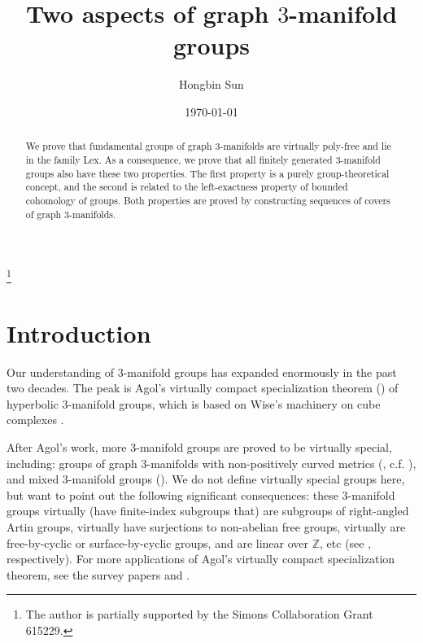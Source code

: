\documentclass{amsart}
\numberwithin{equation}{section}
\theoremstyle{definition}
\begin{document}
\title[Two aspects of graph $3$-manifold groups]{Two aspects of graph $3$-manifold groups}



\author{Hongbin Sun}
\address{Department of Mathematics, Rutgers University - New Brunswick, Hill Center, Busch Campus, Piscataway, NJ 08854, USA}

\thanks{The author is partially supported by the Simons Collaboration Grant 615229.}

\date{\today}
\begin{abstract} 
We prove that fundamental groups of graph $3$-manifolds are virtually poly-free and lie in the family Lex. As a consequence, we prove that all finitely generated $3$-manifold groups also have these two properties. The first property is a purely group-theoretical concept, and the second is related to the left-exactness property of bounded cohomology of groups. Both properties are proved by constructing sequences of covers of graph $3$-manifolds.
\end{abstract}

\maketitle
\vspace{-.5cm}
\section{Introduction}

Our understanding of $3$-manifold groups has expanded enormously in the past two decades. The peak is Agol's virtually compact specialization theorem (\cite{Agol}) of hyperbolic $3$-manifold groups, which is based on Wise's machinery on cube complexes \cite{Wise}. 

After Agol's work, more $3$-manifold groups are proved to be virtually special, including: groups of graph $3$-manifolds with non-positively curved metrics (\cite{Liu}, c.f. \cite{PW1}), and mixed $3$-manifold groups (\cite{PW2}). We do not define virtually special groups here, but want to point out the following significant consequences: these $3$-manifold groups virtually (have finite-index subgroups that) are subgroups of right-angled Artin groups, virtually have surjections to non-abelian free groups, virtually are free-by-cyclic or surface-by-cyclic groups, and are linear over $\mathbb{Z}$, etc (see \cite[(H.5),  (H.13), (H.20), (H.31)]{AFW}, respectively). For more applications of Agol's virtually compact specialization theorem, see the survey papers \cite{AFW} and \cite{LS}.
\end{document}
